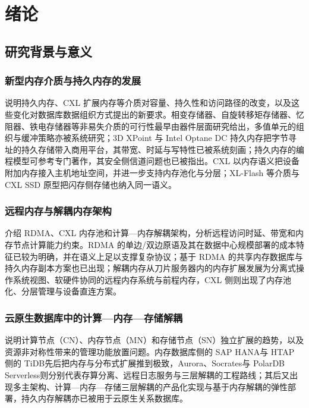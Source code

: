 \chapter{绪论}

\section{研究背景与意义}
\subsection{新型内存介质与持久内存的发展}
说明持久内存、CXL 扩展内存等介质对容量、持久性和访问路径的改变，以及这些变化对数据库数据组织方式提出的新要求。相变存储器、自旋转移矩存储器、忆阻器、铁电存储器等非易失介质的可行性最早由器件层面研究给出\cite{leeArchitecting2009,wongPhase2010,kawaharaScalable2011,strukovMissing2008,mikolajickFeram2001}，多值单元的组织与缓冲策略亦被系统研究\cite{yoonEfficient2014}；3D XPoint 与 Intel Optane DC 持久内存把字节寻址的持久存储带入商用平台\cite{hadyPlatform2017,izraelevitzBasic2019}，其带宽、时延与写特性已被系统刻画\cite{yangEmpirical2020,xiangCharacterizing2022,wangCharacterizing2020}；持久内存的编程模型可参考专门著作\cite{scargallProgramming2020}，其安全侧信道问题也已被指出\cite{liuSide2023}。CXL 以内存语义把设备附加内存接入主机地址空间\cite{cxlConsortium2025,jungHello2022}，并进一步支持内存池化与分层\cite{liPond2023,zhongManaging2024}；XL-Flash 等介质与 CXL SSD 原型把闪存侧存储也纳入同一语义\cite{kioxiaXlflash2024,kennedySamsung2022}。
\subsection{远程内存与解耦内存架构}
介绍 RDMA、CXL 内存池和计算—内存解耦架构，分析远程访问时延、带宽和内存节点计算能力约束。RDMA 的单边/双边原语及其在数据中心规模部署的成本特征已较为明确\cite{guoRdma2016,kaliaDesign2016,kaliaUsing2014,kaliaFasst2016}，并在语义上足以支撑复杂协议\cite{redaRdma2022}；基于 RDMA 的共享内存数据库与持久内存副本方案也已出现\cite{wangCase2022,wangReplicating2023}；解耦内存从刀片服务器内的内存扩展\cite{limDisaggregated2009}发展为分离式操作系统视图\cite{shanLeGo2018}、软硬件协同的远程内存系统\cite{guoClio2022,aguileraRemote2018}与前程内存\cite{guEfficient2017,amaroCan2020,ruanAifm2020}，CXL 侧则出现了内存池化、分层管理与设备直连方案\cite{liPond2023,zhongManaging2024,fridmanCxl2023,goukDirectcxl2022}。
\subsection{云原生数据库中的计算—内存—存储解耦}
说明计算节点（CN）、内存节点（MN）和存储节点（SN）独立扩展的趋势，以及资源非对称性带来的管理功能放置问题。内存数据库侧的 SAP HANA\cite{farberSap2012}与 HTAP 侧的 TiDB\cite{huangTidb2020}先后把内存与分布式扩展推到极致，Aurora\cite{verbitskiAmazon2017}、Socrates\cite{antonopoulosSocrates2019}与 PolarDB Serverless\cite{caoPolardb2021}则分别代表存算分离、远程日志服务与三层解耦的工程路线；其后又出现多主架构\cite{yangPolardb2024,depoutovitchTaurus2023}、计算—内存—存储三层解耦的产品化实现\cite{liGaussdb2024}与基于内存解耦的弹性部署\cite{zhangTowards2021}，持久内存解耦亦已被用于云原生关系数据库\cite{ruanPersistent2023}。
